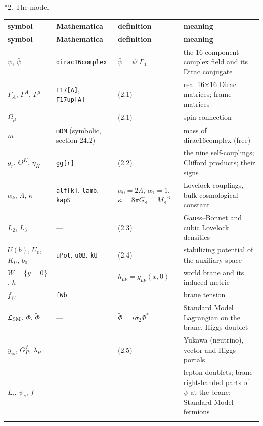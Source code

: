 \documentclass[10pt,a4paper]{article}
\makeatletter
\renewcommand\section{\@startsection{section}{1}{\z@}{-3.5ex \@plus -1ex \@minus -.2ex}{2.3ex \@plus.2ex}{\normalfont\Large\bfseries\raggedright}}
\makeatother
\begin{document}
\section*{2. The model}
{\small
\begin{longtable}{>{\raggedright\arraybackslash}p{}>{\raggedright\arraybackslash}p{}>{\raggedright\arraybackslash}p{}>{\raggedright\arraybackslash}p{}}
\toprule
\textbf{symbol} & \textbf{Mathematica} & \textbf{definition} & \textbf{meaning} \\
\midrule\endfirsthead
\toprule
\textbf{symbol} & \textbf{Mathematica} & \textbf{definition} & \textbf{meaning} \\
\midrule\endhead
\endfoot
\bottomrule\endlastfoot
$\psi$, $\bar\psi$ & \texttt{dirac16complex} & $\bar\psi=\psi^\dagger\Gamma_0$ & the 16-component complex field and its Dirac conjugate \\
$\Gamma_A$, $\Gamma^A$, $\Gamma^\mu$ & \texttt{Γ17[A]}, \texttt{Γ17up[A]} & (2.1) & real 16×16 Dirac matrices; frame matrices \\
$\Omega_\mu$ & — & (2.1) & spin connection \\
$m$ & \texttt{mDM} (symbolic, section 24.2) &  & mass of dirac16complex (free) \\
$g_r$, $\Theta^K$, $\eta_K$ & \texttt{gg[r]} & (2.2) & the nine self-couplings; Clifford products; their signs \\
$\alpha_k$, $\Lambda$, $\kappa$ & \texttt{alf[k]}, \texttt{lamb}, \texttt{kapS} & $\alpha_0=2\Lambda$, $\alpha_1=1$, $\kappa=8\pi G_8=M_8^{-6}$ & Lovelock couplings, bulk cosmological constant \\
$L_2$, $L_3$ & — & (2.3) & Gauss–Bonnet and cubic Lovelock densities \\
$U(b)$, $U_0$, $K_U$, $b_0$ & \texttt{uPot}, \texttt{u0B}, \texttt{kU} & (2.4) & stabilizing potential of the auxiliary space \\
$W=\lbrace y=0\rbrace$, $h$ & — & $h_{\mu\nu}=g_{\mu\nu}(x,0)$ & world brane and its induced metric \\
$f_W$ & \texttt{fWb} &  & brane tension \\
$\mathcal L_{\rm SM}$, $\Phi$, $\tilde\Phi$ & — & $\tilde\Phi=i\sigma_2\Phi^*$ & Standard Model Lagrangian on the brane, Higgs doublet \\
$y_{is}$, $G_P^f$, $\lambda_P$ & — & (2.5) & Yukawa (neutrino), vector and Higgs portals \\
$L_i$, $\psi_s$, $f$ & — &  & lepton doublets; brane-right-handed parts of $\psi$ at the brane; Standard Model fermions \\*
\end{longtable}}
\end{document}
